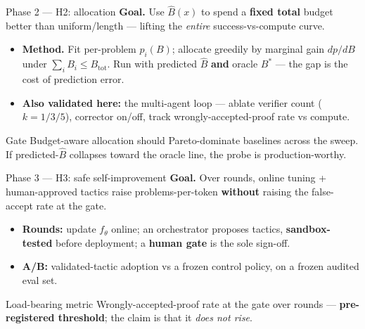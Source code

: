 \documentclass[aspectratio=169,12pt,t,compress]{beamer}
\begin{document}
\begin{frame}{Phase 2 --- H2: allocation}
	\textbf{Goal.} Use $\hat{B}(x)$ to spend a \textbf{fixed total} budget better
	than uniform/length --- lifting the \emph{entire} success-vs-compute curve.

	\vspace{0.4em}
	\begin{itemize}\small
		\item \textbf{Method.} Fit per-problem $p_i(B)$; allocate greedily by
		      marginal gain $dp/dB$ under $\sum_i B_i \le B_\text{tot}$. Run with
		      predicted $\hat{B}$ \textbf{and} oracle $B^*$ --- the gap is the
		      cost of prediction error.
		\item \textbf{Also validated here:} the multi-agent loop --- ablate
		      verifier count ($k = 1/3/5$), corrector on/off, track
		      wrongly-accepted-proof rate vs compute.
	\end{itemize}

	\vspace{0.3em}
	\begin{alertblock}{Gate}
		\footnotesize
		Budget-aware allocation should Pareto-dominate baselines across the
		sweep. If predicted-$\hat{B}$ collapses toward the oracle line, the probe
		is production-worthy.
	\end{alertblock}
\end{frame}

\begin{frame}{Phase 3 --- H3: safe self-improvement}
	\textbf{Goal.} Over rounds, online tuning + human-approved tactics raise
	problems-per-token \textbf{without} raising the false-accept rate at the gate.

	\vspace{0.4em}
	\begin{itemize}\small
		\item \textbf{Rounds:} update $f_\theta$ online; an orchestrator proposes
		      tactics, \textbf{sandbox-tested} before deployment; a \textbf{human
		      gate} is the sole sign-off.
		\item \textbf{A/B:} validated-tactic adoption vs a frozen control policy,
		      on a frozen audited eval set.
	\end{itemize}

	\vspace{0.3em}
	\begin{block}{Load-bearing metric}
		\footnotesize
		Wrongly-accepted-proof rate at the gate over rounds ---
		\textbf{pre-registered threshold}; the claim is that it \emph{does not rise}.
	\end{block}
\end{frame}
\end{document}
